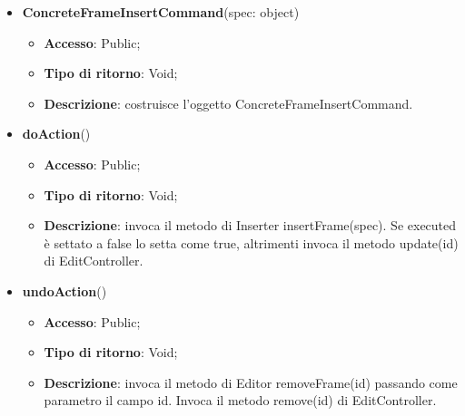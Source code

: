 {{{	
	\begin{itemize}
		\item \textbf{ConcreteFrameInsertCommand}(spec: object)
		\begin{itemize}
			\item \textbf{Accesso}: Public;
			\item \textbf{Tipo di ritorno}: Void;
			\item \textbf{Descrizione}: costruisce l’oggetto ConcreteFrameInsertCommand.
		\end{itemize}
		\item \textbf{doAction}()
		\begin{itemize}
			\item \textbf{Accesso}: Public;
			\item \textbf{Tipo di ritorno}: Void;
			\item \textbf{Descrizione}: invoca il metodo di Inserter insertFrame(spec). Se executed è settato a false lo setta come true, altrimenti invoca il metodo update(id) di EditController.
		\end{itemize}
		\item \textbf{undoAction}()
		\begin{itemize}
			\item \textbf{Accesso}: Public;
			\item \textbf{Tipo di ritorno}: Void;
			\item \textbf{Descrizione}: invoca il metodo di Editor removeFrame(id) passando come parametro il campo id. Invoca il metodo remove(id) di EditController.
		\end{itemize}
	\end{itemize}
	}
}}
